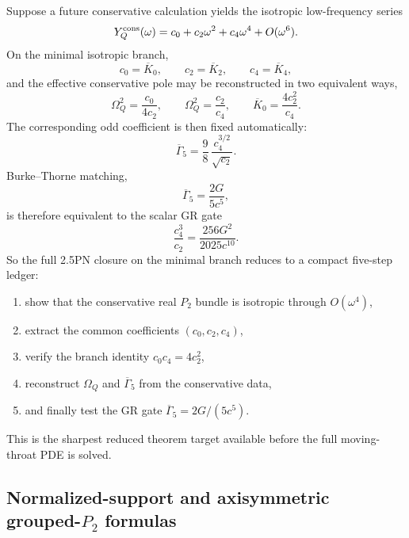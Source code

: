 \documentclass[11pt]{article}
\begin{document}
Suppose a future conservative calculation yields the isotropic low-frequency
series
\[
Y_Q^{\rm cons}(\omega)=c_0+c_2\omega^2+c_4\omega^4+O(\omega^6).
\]
On the minimal isotropic branch,
\[
c_0=\overline K_0,
\qquad
c_2=\overline K_2,
\qquad
c_4=\overline K_4,
\]
and the effective conservative pole may be reconstructed in two equivalent ways,
\[
\Omega_Q^2=\frac{c_0}{4c_2},
\qquad
\Omega_Q^2=\frac{c_2}{c_4},
\qquad
\overline K_0=\frac{4c_2^2}{c_4}.
\]
The corresponding odd coefficient is then fixed automatically:
\begin{equation}
\boxed{
\overline\Gamma_5
=
\frac{9}{8}\,\frac{c_4^{3/2}}{\sqrt{c_2}}.
}
\label{eq:qnorm-gamma-from-c2c4}
\end{equation}
Burke--Thorne matching,
\[
\overline\Gamma_5=\frac{2G}{5c^5},
\]
is therefore equivalent to the scalar GR gate
\begin{equation}
\boxed{
\frac{c_4^3}{c_2}=\frac{256G^2}{2025c^{10}}.
}
\label{eq:qnorm-direct-gr-gate}
\end{equation}
So the full 2.5PN closure on the minimal branch reduces to a compact
five-step ledger:
\begin{enumerate}
  \item show that the conservative real $P_2$ bundle is isotropic through
  $O(\omega^4)$,
  \item extract the common coefficients $(c_0,c_2,c_4)$,
  \item verify the branch identity $c_0c_4=4c_2^2$,
  \item reconstruct $\Omega_Q$ and $\overline\Gamma_5$ from the conservative
  data,
  \item and finally test the GR gate
  \(\overline\Gamma_5=2G/(5c^5)\).
\end{enumerate}
This is the sharpest reduced theorem target available before the full
moving-throat PDE is solved.

\subsection{Normalized-support and axisymmetric grouped-\texorpdfstring{$P_2$}{P\_2} formulas}
\label{app:qnorm-normalized-support}
\end{document}
